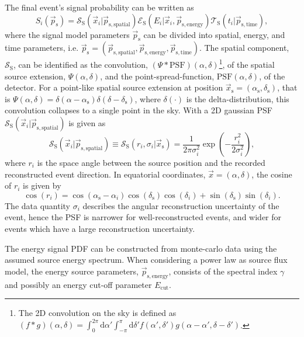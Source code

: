 \documentclass{article}
\newcommand{\ps}{\vec{p}_{\mathrm{s}}}
\newcommand{\xs}{\vec{x}_{\mathrm{s}}}
\begin{document}
The final event's signal probability can be written as
\begin{equation}
 S_i(\ps) = \mathcal{S}_{\mathrm{S}}(\vec{x}_i|\vec{p}_{\mathrm{s,spatial}}) \mathcal{E}_{\mathrm{S}}(E_i|\vec{x}_i,\vec{p}_{\mathrm{s,energy}}) \mathcal{T}_{\mathrm{S}}(t_i|\vec{p}_{\mathrm{s,time}}),
 \label{eq:Si}
\end{equation}
where the signal model parameters $\ps$ can be divided into spatial, energy, and
time parameters, i.e. $\vec{p}_{\mathrm{s}} = (\vec{p}_{\mathrm{s,spatial}},
\vec{p}_{\mathrm{s,energy}}, \vec{p}_{\mathrm{s,time}})$. The spatial component,
$\mathcal{S}_{\mathrm{S}}$, can be identified as the convolution,
$(\Psi \ast \mathrm{PSF})(\alpha,\delta)$\footnote{The 2D convolution on the sky
is defined as
$(f \ast g)(\alpha,\delta) = \int_{0}^{2\pi} \mathrm{d}\alpha' \int_{-\pi}^{\pi} \mathrm{d}\delta' f(\alpha',\delta')g(\alpha-\alpha',\delta-\delta')$.},
of the spatial source extension, $\Psi(\alpha,\delta)$, and the point-spread-function,
$\mathrm{PSF}(\alpha,\delta)$, of the detector.
For a point-like spatial source extension at position
$\xs = (\alpha_{\mathrm{s}},\delta_{\mathrm{s}})$, that is
$\Psi(\alpha,\delta) = \delta(\alpha-\alpha_{\mathrm{s}})\delta(\delta-\delta_{\mathrm{s}})$,
where $\delta(\cdot)$ is the delta-distribution, this convolution collapses to
a single point in the sky. With a 2D gaussian PSF
$\mathcal{S}_{\mathrm{S}}(\vec{x}_i|\vec{p}_{\mathrm{s,spatial}})$ is given as
\begin{equation}
 \mathcal{S}_{\mathrm{S}}(\vec{x}_i|\vec{p}_{\mathrm{s,spatial}}) \equiv \mathcal{S}_{\mathrm{S}}(r_i,\sigma_i|\xs) = \frac{1}{2\pi\sigma_i^2}\exp\left({-\frac{r_i^2}{2\sigma_i^2}}\right),
\end{equation}
where $r_i$ is the space angle between the source position and the recorded
reconstructed event direction. In equatorial coordinates,
$\vec{x} = (\alpha,\delta)$, the cosine of $r_i$ is given by
\begin{equation}
 \cos(r_i) = \cos(\alpha_{\mathrm{s}} - \alpha_i) \cos(\delta_{\mathrm{s}})\cos({\delta_i}) + \sin(\delta_{\mathrm{s}})\sin(\delta_i).
\end{equation}
The data quantity $\sigma_i$ describes the angular reconstruction uncertainty of
the event, hence the PSF is narrower for well-reconstructed events, and wider
for events which have a large reconstruction uncertainty.

The energy signal PDF can be constructed from monte-carlo data using the assumed
source energy spectrum.
When considering a power law as source flux model, the energy source parameters,
$\vec{p}_{\mathrm{s,energy}}$, consists of the spectral index $\gamma$ and possibly
an energy cut-off parameter $E_{\mathrm{cut}}$.
\end{document}
